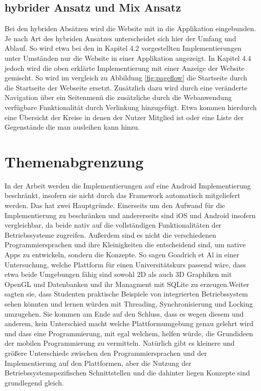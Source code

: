 \subsection{hybrider Ansatz und Mix Ansatz}
Bei den hybriden Absätzen wird die Website mit in die Applikation eingebunden. Je nach Art des hybriden Ansatzes unterscheidet sich hier der Umfang und Ablauf. So wird etwa bei den in Kapitel 4.2 vorgestellten Implementierungen unter Umständen nur die Website in einer Applikation angezeigt. In Kapitel 4.4 jedoch wird die oben erklärte Implementierung mit einer Anzeige der Website gemischt. So wird im vergleich zu Abbildung \ref{fig:pageflow} die Startseite durch die Startseite der Webseite ersetzt. Zusätzlich dazu wird durch eine veränderte Navigation über ein Seitenmenü die zusätzliche durch die Webanwendung verfügbare Funktionalität durch Verlinkung hinzugefügt. Etwa kommen hierdurch eine Übersicht der Kreise in denen der Nutzer Mitglied ist oder eine Liste der Gegenstände die man ausleihen kann hinzu.

\section{Themenabgrenzung}
In der Arbeit werden die Implementierungen auf eine Android Implementierung beschränkt, insofern sie nicht durch das Framework automatisch mitgeliefert werden. Das hat zwei Hauptgründe. Einerseits um den Aufwand für die Implementierung zu beschränken und andererseits sind iOS und Android insofern vergleichbar, da beide nativ auf die vollständigen Funktionalitäten der Betriebssysteme zugreifen. Außerdem sind es nicht die verschiedenen Programmiersprachen und ihre Kleinigkeiten die entscheidend sind, um native Apps zu entwickeln, sondern die Konzepte. So sagen Goadrich et Al in einer Untersuchung, welche Plattform für einen Universitätskurs passend wäre, dass etwa beide Umgebungen fähig sind sowohl 2D als auch 3D Graphiken mit OpenGL und Datenbanken und ihr Managment mit SQLite zu erzeugen.\cite{iOSvsAndroid}Weiter sagten sie, dass Studenten praktische Beispiele von integrierten Betriebssystem sehen könnten und lernen würden mit Threading, Synchronisierung und Locking umzugehen\cite{iOSvsAndroid}. Sie kommen am Ende auf den Schluss, dass es wegen diesem und anderem, kein Unterschied macht welche Plattformumgebung genau gelehrt wird und dass eine Programmierung, mit egal welchem, helfen würde, die Grundideen der mobilen Programmierung zu vermitteln. \cite{iOSvsAndroid}
Natürlich gibt es kleinere und größere Unterschiede zwischen den Programmiersprachen und der Implementierung auf den Plattformen, aber die Nutzung der Betriebssystemspezifischen Schnittstellen und die dahinter liegen Konzepte sind grundlegend gleich.

